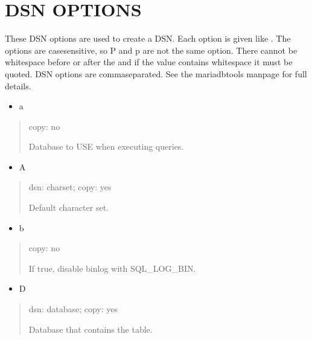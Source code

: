 \documentclass[letterpaper,10pt,english]{sphinxmanual}
\begin{document}
\section{DSN OPTIONS}
\label{\detokenize{mariadb-archiver:dsn-options}}
\sphinxAtStartPar
These DSN options are used to create a DSN.  Each option is given like
.  The options are case\sphinxhyphen{}sensitive, so P and p are not the
same option.  There cannot be whitespace before or after the \sphinxcode{\sphinxupquote{=}} and
if the value contains whitespace it must be quoted.  DSN options are
comma\sphinxhyphen{}separated.  See the mariadb\sphinxhyphen{}tools manpage for full details.
\begin{itemize}
\item {} 
\sphinxAtStartPar
a

\end{itemize}
\begin{quote}

\sphinxAtStartPar
copy: no

\sphinxAtStartPar
Database to USE when executing queries.
\end{quote}
\begin{itemize}
\item {} 
\sphinxAtStartPar
A

\end{itemize}
\begin{quote}

\sphinxAtStartPar
dsn: charset; copy: yes

\sphinxAtStartPar
Default character set.
\end{quote}
\begin{itemize}
\item {} 
\sphinxAtStartPar
b

\end{itemize}
\begin{quote}

\sphinxAtStartPar
copy: no

\sphinxAtStartPar
If true, disable binlog with SQL\_LOG\_BIN.
\end{quote}
\begin{itemize}
\item {} 
\sphinxAtStartPar
D

\end{itemize}
\begin{quote}

\sphinxAtStartPar
dsn: database; copy: yes

\sphinxAtStartPar
Database that contains the table.
\end{quote}
\end{document}

